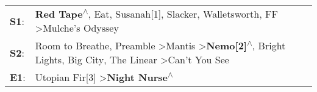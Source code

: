 \begin{supertabular}{p{0.03\textwidth}p{0.92\textwidth}}
 \textbf{S1}:  &                                                  \textbf{Red Tape\textsuperscript{$\wedge$}}, \enspace Eat\textsuperscript{}, \enspace Susanah[1]\textsuperscript{}, \enspace Slacker\textsuperscript{}, \enspace Walletsworth\textsuperscript{}, \enspace FF\textsuperscript{} \textgreater \enspace Mulche's Odyssey\textsuperscript{}  \enspace  \\
 \textbf{S2}:  &  Room to Breathe\textsuperscript{}, \enspace Preamble\textsuperscript{} \textgreater \enspace Mantis\textsuperscript{} \textgreater \enspace \textbf{Nemo[2]\textsuperscript{$\wedge$}}, \enspace Bright Lights, Big City\textsuperscript{}, \enspace The Linear\textsuperscript{} \textgreater \enspace Can't You See\textsuperscript{}  \enspace  \\
 \textbf{E1}:  &                                                                                                                                                                                                                                    Utopian Fir[3]\textsuperscript{} \textgreater \enspace \textbf{Night Nurse\textsuperscript{$\wedge$}}  \enspace  \\
\end{supertabular}
